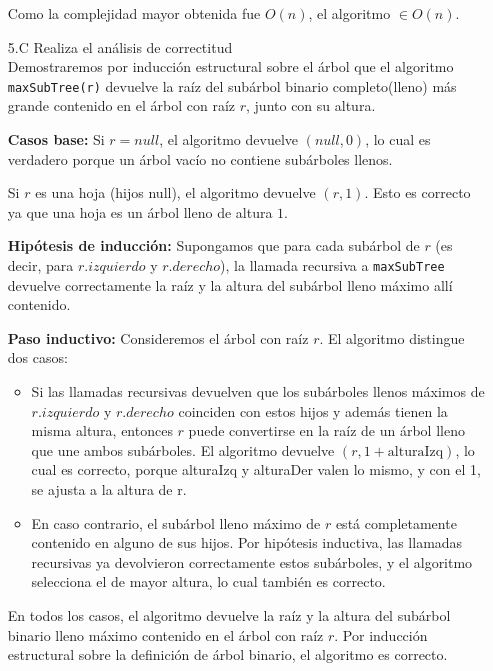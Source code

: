 \documentclass[12pt]{article}
\begin{document}
\begin{itemize}
    Como la complejidad mayor obtenida fue $O(n)$, el algoritmo $\in O(n)$.\\

    \item[5.C] Realiza el análisis de correctitud\\
    Demostraremos por inducción estructural sobre el árbol que el algoritmo
    \texttt{maxSubTree(r)} devuelve la raíz del subárbol binario completo(lleno) más
    grande contenido en el árbol con raíz $r$, junto con su altura.

    \textbf{Casos base:}
    Si $r = null$, el algoritmo devuelve $(null,0)$, lo cual es verdadero
    porque un árbol vacío no contiene subárboles llenos.

    Si $r$ es una hoja (hijos null), el algoritmo devuelve $(r,1)$.
    Esto es correcto ya que una hoja es un árbol lleno de altura $1$.

    \textbf{Hipótesis de inducción:}
    Supongamos que para cada subárbol de $r$ (es decir, para $r.izquierdo$
    y $r.derecho$), la llamada recursiva a \texttt{maxSubTree} devuelve
    correctamente la raíz y la altura del subárbol lleno máximo allí contenido.

    \textbf{Paso inductivo:}
    Consideremos el árbol con raíz $r$. El algoritmo distingue dos casos:

    \begin{itemize}
        \item Si las llamadas recursivas devuelven que los subárboles llenos
        máximos de $r.izquierdo$ y $r.derecho$ coinciden con estos hijos y
        además tienen la misma altura, entonces $r$ puede convertirse en la raíz
        de un árbol lleno que une ambos subárboles. El algoritmo devuelve
        $(r,1+\text{alturaIzq})$, lo cual es correcto, porque alturaIzq y alturaDer valen lo mismo, y con el 1, se ajusta a la altura de r.

        \item En caso contrario, el subárbol lleno máximo de $r$ está
        completamente contenido en alguno de sus hijos. Por hipótesis inductiva,
        las llamadas recursivas ya devolvieron correctamente estos subárboles,
        y el algoritmo selecciona el de mayor altura, lo cual también es correcto.
    \end{itemize}

    En todos los casos, el algoritmo devuelve la raíz y la altura del subárbol
    binario lleno máximo contenido en el árbol con raíz $r$. Por inducción
    estructural sobre la definición de árbol binario, el algoritmo es correcto.

\end{itemize}
\end{document}
